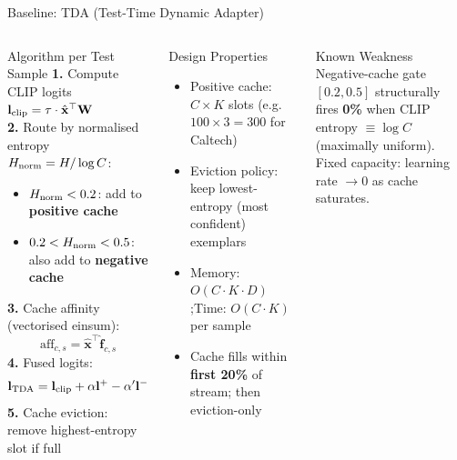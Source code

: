 \documentclass[aspectratio=169,11pt]{beamer}
\newcommand{\highlight}[1]{\textcolor{accent}{\textbf{#1}}}
\newcommand{\blue}[1]{\textcolor{primary}{\textbf{#1}}}
\begin{document}
\begin{frame}{Baseline: TDA (Test-Time Dynamic Adapter)}
\begin{columns}[T]
  \begin{block}{Algorithm per Test Sample}
    \footnotesize
    \textbf{1.} Compute CLIP logits\;
    $\mathbf{l}_{\rm clip} = \tau\cdot\hat{\mathbf{x}}^\top\mathbf{W}$\\[3pt]
    \textbf{2.} Route by normalised entropy $H_{\rm norm} = H/\log C$:
    \begin{itemize}\footnotesize\setlength{\itemsep}{1pt}
      \item $H_{\rm norm} < 0.2$\;: add to \blue{positive cache}
      \item $0.2 < H_{\rm norm} < 0.5$\;: also add to \highlight{negative cache}
    \end{itemize}
    \textbf{3.} Cache affinity (vectorised einsum):
    \[\text{aff}_{c,s} = \hat{\mathbf{x}}^\top \hat{\mathbf{f}}_{c,s}\]
    \textbf{4.} Fused logits:
    \[\mathbf{l}_{\rm TDA} = \mathbf{l}_{\rm clip} + \alpha\mathbf{l}^+ - \alpha'\mathbf{l}^-\]
    \textbf{5.} Cache eviction: remove highest-entropy slot if full
  \end{block}
  \begin{exampleblock}{Design Properties}
    \begin{itemize}\footnotesize\setlength{\itemsep}{2pt}
      \item Positive cache: $C \times K$ slots (e.g.\ $100{\times}3{=}300$ for Caltech)
      \item Eviction policy: keep lowest-entropy (most confident) exemplars
      \item Memory: $O(C \cdot K \cdot D)$;\quad Time: $O(C \cdot K)$ per sample
      \item Cache fills within \textbf{first 20\%} of stream; then eviction-only
    \end{itemize}
  \end{exampleblock}
  \begin{alertblock}{\footnotesize Known Weakness}
    \footnotesize Negative-cache gate $[0.2,0.5]$ structurally fires \textbf{0\%} when CLIP entropy $\equiv\log C$ (maximally uniform). Fixed capacity: learning rate $\to 0$ as cache saturates.
  \end{alertblock}
\end{columns}
\end{frame}
\end{document}
